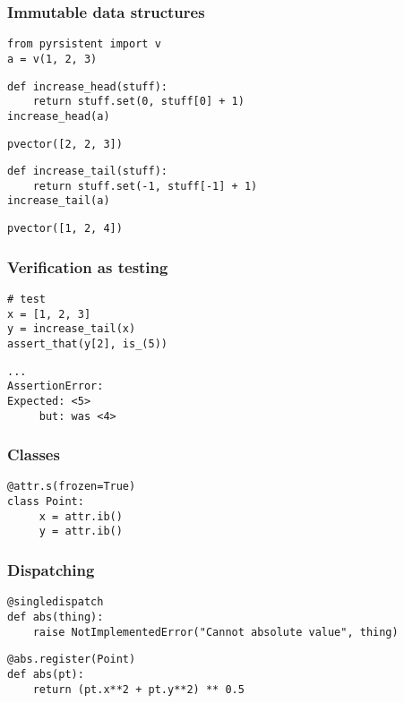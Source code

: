 \begin{frame}[fragile]
\frametitle{Immutable data structures}

\begin{lstlisting}[frame=single]
from pyrsistent import v
a = v(1, 2, 3)
\end{lstlisting}

\begin{lstlisting}[frame=single]
def increase_head(stuff):
    return stuff.set(0, stuff[0] + 1)
increase_head(a)
\end{lstlisting}

\begin{lstlisting}[frame=single]
pvector([2, 2, 3])
\end{lstlisting}

\begin{lstlisting}[frame=single]
def increase_tail(stuff):
    return stuff.set(-1, stuff[-1] + 1)
increase_tail(a)
\end{lstlisting}

\begin{lstlisting}[frame=single]
pvector([1, 2, 4])
\end{lstlisting}

\end{frame}

\begin{frame}[fragile]
\frametitle{Verification as testing}

\begin{lstlisting}[frame=single]
# test
x = [1, 2, 3]
y = increase_tail(x)
assert_that(y[2], is_(5))
\end{lstlisting}

\begin{lstlisting}[frame=single]
...
AssertionError: 
Expected: <5>
     but: was <4>
\end{lstlisting}

\end{frame}

\begin{frame}[fragile]
\frametitle{Classes}

\begin{lstlisting}[frame=single]
@attr.s(frozen=True)
class Point:
     x = attr.ib()
     y = attr.ib()
\end{lstlisting}


\end{frame}

\begin{frame}[fragile]
\frametitle{Dispatching}

\begin{lstlisting}[frame=single]
@singledispatch
def abs(thing):
    raise NotImplementedError("Cannot absolute value", thing)
\end{lstlisting}

\begin{lstlisting}[frame=single]
@abs.register(Point)
def abs(pt):
    return (pt.x**2 + pt.y**2) ** 0.5
\end{lstlisting}

\end{frame}

